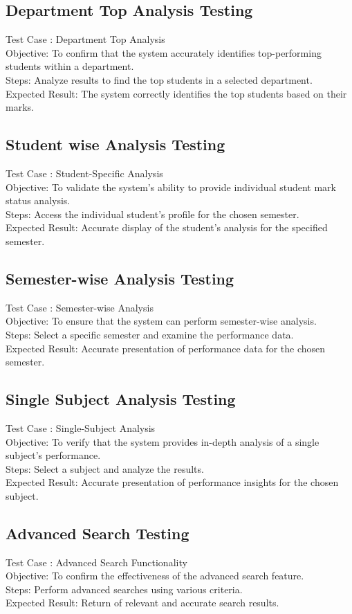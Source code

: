 \documentclass{nascproject}
\begin{document}
\subsection{Department Top Analysis Testing}
Test Case : Department Top Analysis\\
Objective: To confirm that the system accurately identifies top-performing students within a department.\\
Steps: Analyze results to find the top students in a selected department.\\
Expected Result: The system correctly identifies the top students based on their marks.
\subsection{ Student wise Analysis Testing}
Test Case : Student-Specific Analysis\\
Objective: To validate the system's ability to provide individual student mark status analysis.\\
Steps: Access the individual student's profile for the chosen semester.\\
Expected Result: Accurate display of the student's analysis for the specified semester.\\
\subsection{Semester-wise Analysis Testing}
Test Case : Semester-wise Analysis\\
Objective: To ensure that the system can perform semester-wise analysis.\\
Steps: Select a specific semester and examine the performance data.\\
Expected Result: Accurate presentation of performance data for the chosen semester.
\subsection{Single Subject Analysis Testing}
Test Case : Single-Subject Analysis\\
Objective: To verify that the system provides in-depth analysis of a single subject's performance.\\
Steps: Select a subject and analyze the results.\\
Expected Result: Accurate presentation of performance insights for the chosen subject.
\subsection{ Advanced Search Testing}
Test Case : Advanced Search Functionality\\
Objective: To confirm the effectiveness of the advanced search feature.\\
Steps: Perform advanced searches using various criteria.\\
Expected Result: Return of relevant and accurate search results.\\
\end{document}
